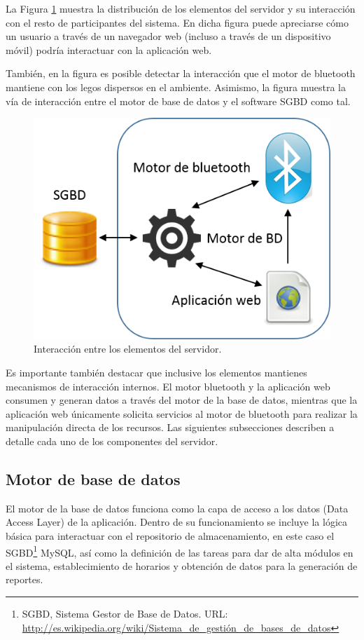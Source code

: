 \documentclass[12pt]{article}
\begin{document}
La Figura \ref{fig:distribucion-elementos} muestra la distribución de los elementos del servidor y su interacción con el resto de participantes del sistema.
En dicha figura puede apreciarse cómo un usuario a través de un navegador web (incluso a través de un dispositivo móvil) podría interactuar con la aplicación web.

También, en la figura es posible detectar la interacción que el motor de bluetooth mantiene con los legos dispersos en el ambiente.
Asimismo, la figura muestra la vía de interacción entre el motor de base de datos y el software SGBD como tal.

\begin{figure}
\centering
\includegraphics[width=\textwidth]{imagenes/distribucion-elementos}
\caption[Arquitectura operacional]{Interacción entre los elementos del servidor.}
\label{fig:distribucion-elementos}
\end{figure}

Es importante también destacar que inclusive los elementos mantienes mecanismos de interacción internos.
El motor bluetooth y la aplicación web consumen y generan datos a través del motor de la base de datos, mientras que la aplicación web únicamente solicita servicios al motor de bluetooth para realizar la manipulación directa de los recursos.
Las siguientes subsecciones describen a detalle cada uno de los componentes del servidor.

\subsection{Motor de base de datos} %
\label{ssub:motor_de_base_de_datos}
El motor de la base de datos funciona como la capa de acceso a los datos (Data Access Layer) de la aplicación.
Dentro de su funcionamiento se incluye la lógica básica para interactuar con el repositorio de almacenamiento, en este caso el SGBD\footnote{SGBD, Sistema Gestor de Base de Datos. URL: \url{http://es.wikipedia.org/wiki/Sistema_de_gestión_de_bases_de_datos}} MySQL, así como la definición de las tareas para dar de alta módulos en el sistema, establecimiento de horarios y obtención de datos para la generación de reportes.
\end{document}

